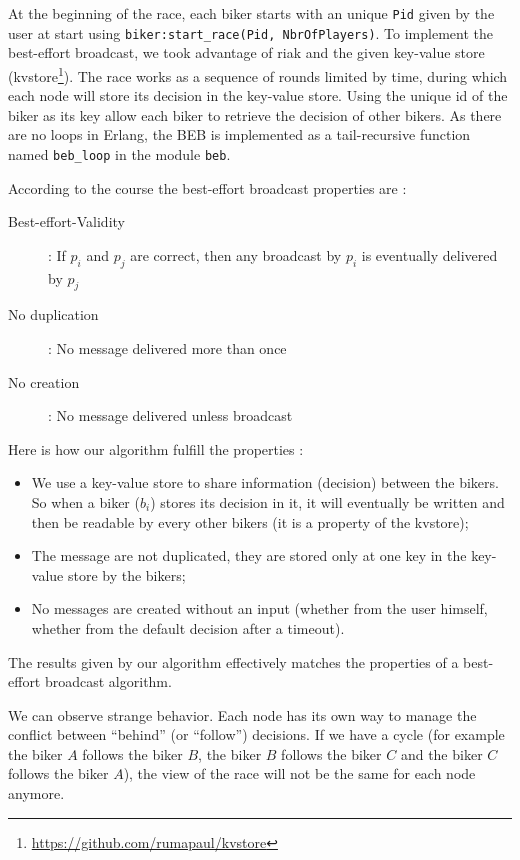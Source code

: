 \documentclass{article}
\begin{document}
At the beginning of the race, each biker starts with an unique \verb#Pid# given by the
user at start using \verb#biker:start_race(Pid, NbrOfPlayers)#. To implement the
best-effort broadcast, we took advantage of riak and the given key-value store
(kvstore\footnote{\url{https://github.com/rumapaul/kvstore}}). The race works
as a sequence of rounds limited by time, during which each node will store its
decision in the key-value store. Using the unique id of the biker as its key allow
each biker to retrieve the decision of other bikers. As there are no loops in
Erlang, the BEB is implemented as a tail-recursive function named \verb#beb_loop#
in the module \verb#beb#.\newline

According to the course the best-effort broadcast properties are :
\begin{description}
    \item[Best-effort-Validity] : If $p_{i}$ and  $p_{j}$ are correct, then
    any broadcast by $p_{i}$ is eventually delivered by $p_{j}$
    \item[No duplication] : No message delivered more than once
    \item[No creation] : No message delivered unless broadcast
\end{description}

Here is how our algorithm fulfill the properties :
\begin{itemize}
\item We use a key-value store to share information (decision) between the
bikers. So when a biker ($b_{i}$) stores its decision in it, it will eventually
be written and then be readable by every other bikers (it is a property of the
kvstore);
\item The message are not duplicated, they are stored only at one key in the
key-value store by the bikers;
\item No messages are created without an input (whether from the user himself,
whether from the default decision after a timeout).
\end{itemize}

The results given by our algorithm effectively matches the properties of a
best-effort broadcast algorithm.\newline

We can observe strange behavior. Each node has its own way to manage the
conflict between \enquote{behind} (or \enquote{follow}) decisions. If we have a
cycle (for example the biker $A$ follows the biker $B$, the biker $B$ follows the
biker $C$ and the biker $C$ follows the biker $A$), the view of the race will not be
the same for each node anymore.
\end{document}

